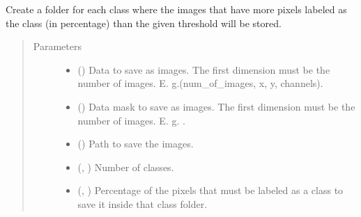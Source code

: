 \documentclass[letterpaper,10pt,english]{sphinxmanual}
\begin{document}
\begin{fulllineitems}
\label{\detokenize{utils/util:utils.util.divide_images_on_classes}}
Create a folder for each class where the images that have more pixels labeled as the class (in percentage) than
the given threshold will be stored.
\begin{quote}\begin{description}
\item[{Parameters}] \leavevmode\begin{itemize}
\item {} 
 () \textendash{} Data to save as images. The first dimension must be the number of images. E. g.\textasciigrave{}\textasciigrave{}(num\_of\_images, x, y, channels)\textasciigrave{}\textasciigrave{}.

\item {} 
 () \textendash{} Data mask to save as images.  The first dimension must be the number of images. E. g. .

\item {} 
 () \textendash{} Path to save the images.

\item {} 
 (, ) \textendash{} Number of classes.

\item {} 
 (, ) \textendash{} Percentage of the pixels that must be labeled as a class to save it inside that class folder.

\end{itemize}

\end{description}\end{quote}

\end{fulllineitems}
\end{document}
